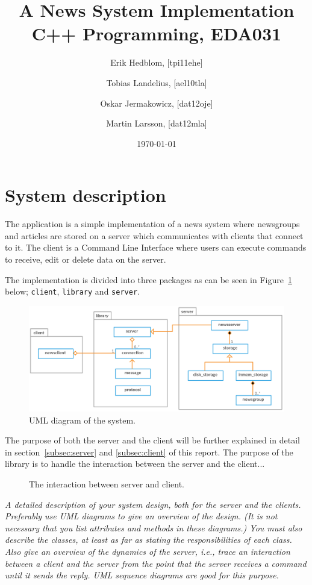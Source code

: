 \documentclass[a4paper]{article}
\title{A News System Implementation \\ C++ Programming, EDA031}
\author{Erik Hedblom, [tpi11ehe]
\and Tobias Landelius, [ael10tla]
\and Oskar Jermakowicz, [dat12oje]
\and Martin Larsson, [dat12mla]}
\date{\today}
\begin{document}
\maketitle

\newpage
\renewcommand{\contentsname}{Table of contents}
\tableofcontents
\newpage

\section{System description}
The application is a simple implementation of a news system where newsgroups and articles are stored on a server which communicates with clients that connect to it. The client is a Command Line Interface where users can execute commands to receive, edit or delete data on the server.

The implementation is divided into three packages as can be seen in Figure~\ref{fig:uml} below; \texttt{client}, \texttt{library} and \texttt{server}.

\begin{figure}[h]
    \centering
    \includegraphics[width=1.0\textwidth]{uml_diagram.png}
    \caption{UML diagram of the system.}
    \label{fig:uml}
\end{figure}

The purpose of both the server and the client will be further explained in detail in section~\ref{subsec:server} and \ref{subsec:client} of this report. The purpose of the library is to handle the interaction between the server and the client...

\begin{figure}[h]
    \centering
    \caption{The interaction between server and client.}
    \label{fig:sequence}
\end{figure}

\emph{A detailed description of your system design, both for the server and the clients. Preferably
use UML diagrams to give an overview of the design. (It is not necessary that you list
attributes and methods in these diagrams.) You must also describe the classes, at least as
far as stating the responsibilities of each class.
Also give an overview of the dynamics of the server, i.e., trace an interaction between a
client and the server from the point that the server receives a command until it sends the
reply. UML sequence diagrams are good for this purpose.}
\end{document}

